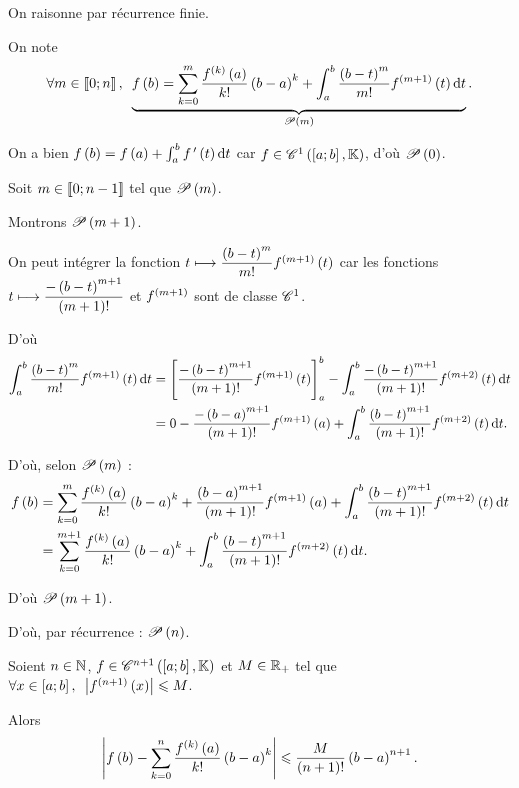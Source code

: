 \begin{dem}
On raisonne par récurrence finie.

On note \[\quantifs{\forall m\in\interventierii{0}{n}}\underbrace{f\paren{b}=\sum_{k=0}^m\dfrac{f\deriv{k}\paren{a}}{k!}\paren{b-a}^k+\int_a^b\dfrac{\paren{b-t}^m}{m!}f\deriv{m+1}\paren{t}\odif{t}}_{\P{m}}.\]

On a bien \(f\paren{b}=f\paren{a}+\int_a^bf\prim\paren{t}\odif{t}\) car \(f\in\ensclasse{1}{\intervii{a}{b}}{\K}\), d'où \(\P{0}\).

Soit \(m\in\interventierii{0}{n-1}\) tel que \(\P{m}\).

Montrons \(\P{m+1}\).

On peut intégrer la fonction \(t\mapsto\dfrac{\paren{b-t}^m}{m!}f\deriv{m+1}\paren{t}\) car les fonctions \(t\mapsto\dfrac{-\paren{b-t}^{m+1}}{\paren{m+1}!}\) et \(f\deriv{m+1}\) sont de classe \(\classe{1}\).

D'où \[\begin{aligned}
\int_a^b\dfrac{\paren{b-t}^m}{m!}f\deriv{m+1}\paren{t}\odif{t}&=\croch{\dfrac{-\paren{b-t}^{m+1}}{\paren{m+1}!}f\deriv{m+1}\paren{t}}_a^b-\int_a^b\dfrac{-\paren{b-t}^{m+1}}{\paren{m+1}!}f\deriv{m+2}\paren{t}\odif{t} \\
&=0-\dfrac{-\paren{b-a}^{m+1}}{\paren{m+1}!}f\deriv{m+1}\paren{a}+\int_a^b\dfrac{\paren{b-t}^{m+1}}{\paren{m+1}!}f\deriv{m+2}\paren{t}\odif{t}.
\end{aligned}\]

D'où, selon \(\P{m}\) : \[\begin{aligned}
f\paren{b}&=\sum_{k=0}^m\dfrac{f\deriv{k}\paren{a}}{k!}\paren{b-a}^k+\dfrac{\paren{b-a}^{m+1}}{\paren{m+1}!}f\deriv{m+1}\paren{a}+\int_a^b\dfrac{\paren{b-t}^{m+1}}{\paren{m+1}!}f\deriv{m+2}\paren{t}\odif{t} \\
&=\sum_{k=0}^{m+1}\dfrac{f\deriv{k}\paren{a}}{k!}\paren{b-a}^k+\int_a^b\dfrac{\paren{b-t}^{m+1}}{\paren{m+1}!}f\deriv{m+2}\paren{t}\odif{t}.
\end{aligned}\]

D'où \(\P{m+1}\).

D'où, par récurrence : \(\P{n}\).
\end{dem}

\begin{cor}
Soient \(n\in\N\), \(f\in\ensclasse{n+1}{\intervii{a}{b}}{\K}\) et \(M\in\Rp\) tel que \(\quantifs{\forall x\in\intervii{a}{b}}\abs{f\deriv{n+1}\paren{x}}\leq M\).

Alors \[\abs{f\paren{b}-\sum_{k=0}^n\dfrac{f\deriv{k}\paren{a}}{k!}\paren{b-a}^k}\leq\dfrac{M}{\paren{n+1}!}\paren{b-a}^{n+1}.\]
\end{cor}

